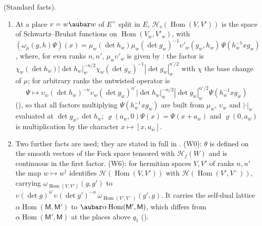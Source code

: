 \documentclass[10pt]{amsart}
\theoremstyle{definition}
\theoremstyle{remark}
\providecommand{\auHom}{\operatorname{Hom}}
\providecommand{\psHS}{\mathcal H}
\providecommand{\psM}{\mathsf M}
\providecommand{\psrho}{\varrho}
\providecommand{\psvac}{\mathbf v}
\newenvironment{quotedthm}[2]{\par\medskip\noindent\begingroup
  \textbf{#1}#2.\ \itshape\ignorespaces}{\endgroup\par\medskip}
\begin{document}
\begin{quotedthm}{\cite[Lemma~5.2]{P49}}{ (Standard facts)}
\begin{enumerate}
$g\in\auU(W)(\auA_f)$ stabilises $L$ then $\omega(g)\psvac_L=\psvac_L$.
\item[(W5)] At a place $v=w\aubar w$ of $E^+$ split in $E$, $\psHS_v(\auHom(V,V'))$ is the space
of Schwartz--Bruhat functions on $\auHom(V_w,V'_w)$, with $(\omega_\mu(g,h)\Psi)(x)=\mu_w(\det h_w)
\mu_w(\det g_w)^{-1}\upsilon'_w(g_w,h_w)\,\Psi(h_w^{-1}xg_w)$, where, for even ranks $n,n'$, $\mu_w\upsilon'_w$ is given by {\cite[(62)]{P49}}: the factor is
$\chi_w(\det h_w)|\det h_w|_w^{-n/2}\chi_w(\det g_w)^{-1}|\det g_w|_w^{n'/2}$ with $\chi$ the base
change of $\mu$; for arbitrary ranks the untwisted operator is
\[\Psi\mapsto\upsilon_w(\det h_w)^{-n}\upsilon_w(\det g_w)^{n'}|\det h_w|_w^{-n/2}|\det g_w|_w^{n'/2}\Psi(h_w^{-1}xg_w)\]
({\cite[Proposition~2.17]{P49}}), so that all factors multiplying $\Psi(h_w^{-1}xg_w)$ are built from $\mu_w$, $\upsilon_w$ and $|\cdot|_w$ evaluated at $\det g_w,\det h_w$; $\psrho(a_w,0)\Psi(x)=\Psi(x+a_w)$
and $\psrho(0,a_{\bar w})$ is multiplication by the character $x\mapsto[x,a_{\bar w}]$.
\item[(W0), (W6)] Two further facts are used; they are stated in full in {\cite[\S5.2.1]{P49}}.
(W0): $\theta$ is defined on the smooth vectors of the Fock space tensored with $\psHS_f(W)$ and is
continuous in the first factor. (W6): for hermitian spaces $V,V'$ of ranks $n,n'$ the map
$w\mapsto w^\dagger$ identifies $\psHS(\auHom(V,V'))$ with $\psHS(\auHom(V',V^-))$, carrying
$\omega_{\auHom(V,V')}(g,g')$ to $\upsilon(\det g)^{n'}\upsilon(\det g')^{-n}\,
\omega_{\auHom(V',V^-)}(g',g)$. It carries the self-dual lattice $\alpha\auHom(\psM,\psM')$ to
$\aubar\alpha\auHom(\psM',\psM)$, which differs from $\alpha\auHom(\psM',\psM)$ at the places above $q_1$
({\cite[Remark~7.18]{P49}}).
\end{enumerate}
\end{quotedthm}
\end{document}
